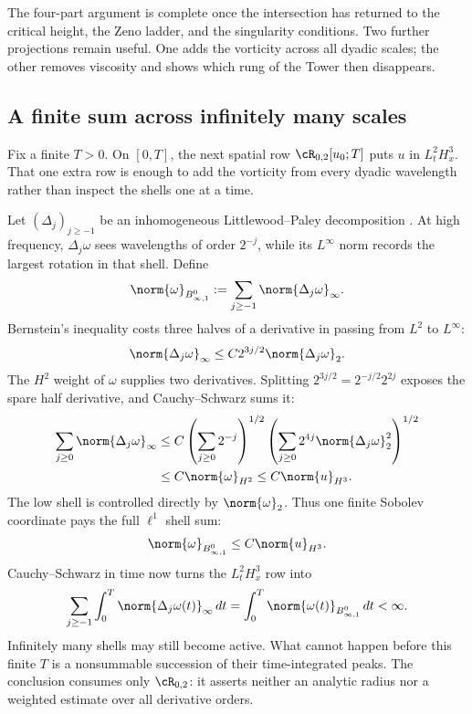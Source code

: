 The four-part argument is complete once the intersection has returned to the
critical height, the Zeno ladder, and the singularity conditions.  Two further
projections remain useful.  One adds the vorticity across all dyadic scales;
the other removes viscosity and shows which rung of the Tower then disappears.

\subsection{A finite sum across infinitely many scales}\label{sub:AFiniteSumAcrossScales}

Fix a finite \(T>0\).  On \([0,T]\), the next spatial row
\(\cR_{0,2}[u_0;T]\) puts \(u\) in \(L^2_tH^3_x\).  That one extra row is
enough to add the vorticity from every dyadic wavelength rather than inspect
the shells one at a time.

Let \((\Delta_j)_{j\geq-1}\) be an inhomogeneous Littlewood--Paley
decomposition \parencite[Chapter~2]{BahouriCheminDanchin2011}.  At high
frequency, \(\Delta_j\omega\) sees wavelengths of order \(2^{-j}\), while its
\(L^\infty\) norm records the largest rotation in that shell.  Define
\[
  \norm{\omega}_{B^0_{\infty,1}}
  :=\sum_{j\geq-1}\norm{\Delta_j\omega}_\infty.
\]
Bernstein's inequality costs three halves of a derivative in passing from
\(L^2\) to \(L^\infty\):
\[
  \norm{\Delta_j\omega}_\infty
  \leq C2^{3j/2}\norm{\Delta_j\omega}_2.
\]
The \(H^2\) weight of \(\omega\) supplies two derivatives.  Splitting
\(2^{3j/2}=2^{-j/2}2^{2j}\) exposes the spare half derivative, and
Cauchy--Schwarz sums it:
\begin{align*}
  \sum_{j\geq0}\norm{\Delta_j\omega}_\infty
  &\leq
  C\left(\sum_{j\geq0}2^{-j}\right)^{1/2}
  \left(\sum_{j\geq0}2^{4j}\norm{\Delta_j\omega}_2^2\right)^{1/2}
  \\
  &\leq C\norm{\omega}_{H^2}
  \leq C\norm{u}_{H^3}.
\end{align*}
The low shell is controlled directly by \(\norm{\omega}_2\).  Thus one finite
Sobolev coordinate pays the full \(\ell^1\) shell sum:
\begin{equation}\label{eq:VorticityBesovFromHThree}
  \norm{\omega}_{B^0_{\infty,1}}
  \leq C\norm{u}_{H^3}.
\end{equation}
Cauchy--Schwarz in time now turns the \(L^2_tH^3_x\) row into
\begin{equation}\label{eq:FiniteDyadicVorticityAction}
  \sum_{j\geq-1}
  \int_0^{T}\norm{\Delta_j\omega(t)}_\infty\,dt
  =\int_0^{T}\norm{\omega(t)}_{B^0_{\infty,1}}\,dt
  <\infty.
\end{equation}
Infinitely many shells may still become active.  What cannot happen before this
finite \(T\) is a nonsummable succession of their time-integrated peaks.
The conclusion consumes only \(\cR_{0,2}\): it asserts neither an analytic
radius nor a weighted estimate over all derivative orders.

